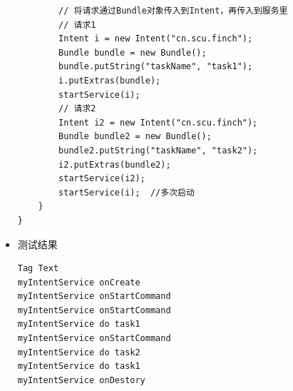 \documentclass[9pt, b5paper]{article}
\begin{document}
\begin{itemize}
\begin{verbatim}
        // 将请求通过Bundle对象传入到Intent，再传入到服务里
        // 请求1
        Intent i = new Intent("cn.scu.finch");
        Bundle bundle = new Bundle();
        bundle.putString("taskName", "task1");
        i.putExtras(bundle);
        startService(i);
        // 请求2
        Intent i2 = new Intent("cn.scu.finch");
        Bundle bundle2 = new Bundle();
        bundle2.putString("taskName", "task2");
        i2.putExtras(bundle2);
        startService(i2);
        startService(i);  //多次启动
    }
}
\end{verbatim}
\item 测试结果
\begin{verbatim}
Tag Text
myIntentService onCreate
myIntentService onStartCommand
myIntentService onStartCommand
myIntentService do task1
myIntentService onStartCommand
myIntentService do task2
myIntentService do task1
myIntentService onDestory
\end{verbatim}
\end{itemize}
\end{document}
